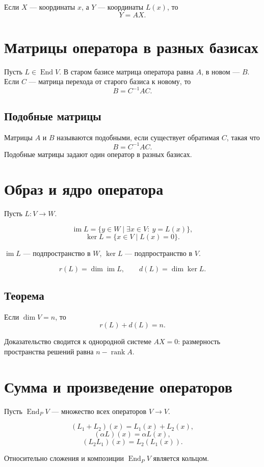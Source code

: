 \documentclass[12pt,a4paper]{article}
\DeclareMathOperator{\End}{End}
\DeclareMathOperator{\Ker}{ker}
\DeclareMathOperator{\Image}{im}
\DeclareMathOperator{\rank}{rank}
\begin{document}
Если $X$ --- координаты $x$, а $Y$ --- координаты $L(x)$, то
\[
    Y=AX.
\]

\section{Матрицы оператора в разных базисах}

Пусть $L\in\End V$. В старом базисе матрица оператора равна $A$, в новом --- $B$. Если $C$ --- матрица перехода от старого базиса к новому, то
\[
    B=C^{-1}AC.
\]

\subsection*{Подобные матрицы}

Матрицы $A$ и $B$ называются подобными, если существует обратимая $C$, такая что
\[
    B=C^{-1}AC.
\]
Подобные матрицы задают один оператор в разных базисах.

\section{Образ и ядро оператора}

Пусть $L:V\to W$.

\[
    \Image L=\{y\in W\mid \exists x\in V:\ y=L(x)\},
\]
\[
    \Ker L=\{x\in V\mid L(x)=0\}.
\]

$\Image L$ --- подпространство в $W$, $\Ker L$ --- подпространство в $V$.

\[
    r(L)=\dim\Image L,\qquad d(L)=\dim\Ker L.
\]

\subsection*{Теорема}

Если $\dim V=n$, то
\[
    r(L)+d(L)=n.
\]

Доказательство сводится к однородной системе $AX=0$: размерность пространства решений равна $n-\rank A$.

\section{Сумма и произведение операторов}

Пусть $\End_PV$ --- множество всех операторов $V\to V$.

\[
    (L_1+L_2)(x)=L_1(x)+L_2(x),
\]
\[
    (\alpha L)(x)=\alpha L(x),
\]
\[
    (L_2L_1)(x)=L_2(L_1(x)).
\]

Относительно сложения и композиции $\End_PV$ является кольцом.
\end{document}
